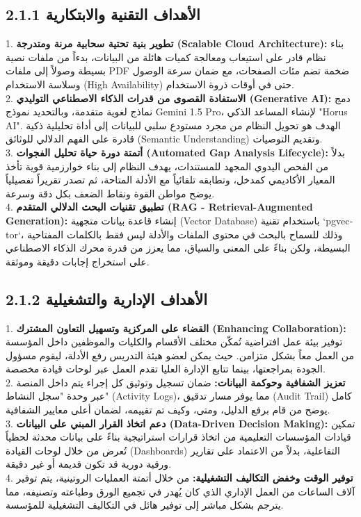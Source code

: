\documentclass[12pt, a4paper]{report}
\begin{document}
\begin{english}
\subsection*{2.1.1 الأهداف التقنية والابتكارية}
1. \textbf{تطوير بنية تحتية سحابية مرنة ومتدرجة (Scalable Cloud Architecture):} بناء نظام قادر على استيعاب ومعالجة كميات هائلة من البيانات، بدءاً من ملفات نصية بسيطة وصولاً إلى ملفات PDF ضخمة تضم مئات الصفحات، مع ضمان سرعة الوصول وسلاسة الاستخدام (High Availability) حتى في أوقات ذروة الاستخدام. \\
2. \textbf{الاستفادة القصوى من قدرات الذكاء الاصطناعي التوليدي (Generative AI):} دمج نماذج لغوية متقدمة، وبالتحديد نموذج Gemini 1.5 Pro، لإنشاء المساعد الذكي "Horus AI". الهدف هو تحويل النظام من مجرد مستودع سلبي للبيانات إلى أداة تحليلية ذكية قادرة على الفهم الدلالي للوثائق (Semantic Understanding) وتقديم التوصيات. \\
3. \textbf{أتمتة دورة حياة تحليل الفجوات (Automated Gap Analysis Lifecycle):} بدلاً من الفحص اليدوي المجهد للمستندات، يهدف النظام إلى بناء خوارزمية قوية تأخذ المعيار الأكاديمي كمدخل، وتطابقه تلقائياً مع الأدلة المتاحة، ثم تصدر تقريراً تفصيلياً يوضح مواطن القوة ونقاط الضعف بكل دقة وسرعة. \\
4. \textbf{تطبيق تقنيات البحث الدلالي المتقدم (RAG - Retrieval-Augmented Generation):} إنشاء قاعدة بيانات متجهية (Vector Database) باستخدام تقنية `pgvector`، وذلك للسماح بالبحث في محتوى الملفات والأدلة ليس فقط بالكلمات المفتاحية البسيطة، ولكن بناءً على المعنى والسياق، مما يعزز من قدرة محرك الذكاء الاصطناعي على استخراج إجابات دقيقة وموثقة. \\

\subsection*{2.1.2 الأهداف الإدارية والتشغيلية}
1. \textbf{القضاء على المركزية وتسهيل التعاون المشترك (Enhancing Collaboration):} توفير بيئة عمل افتراضية تُمكّن مختلف الأقسام والكليات والموظفين داخل المؤسسة من العمل معاً بشكل متزامن. حيث يمكن لعضو هيئة التدريس رفع الأدلة، ليقوم مسؤول الجودة بمراجعتها، بينما تتابع الإدارة العليا تقدم العمل عبر لوحات قيادة مخصصة. \\
2. \textbf{تعزيز الشفافية وحوكمة البيانات:} ضمان تسجيل وتوثيق كل إجراء يتم داخل المنصة عبر وحدة "سجل النشاط" (Activity Logs)، مما يوفر مسار تدقيق (Audit Trail) كامل يوضح من قام برفع الدليل، ومتى، وكيف تم تقييمه، لضمان أعلى معايير الشفافية. \\
3. \textbf{دعم اتخاذ القرار المبني على البيانات (Data-Driven Decision Making):} تمكين قيادات المؤسسات التعليمية من اتخاذ قرارات استراتيجية بناءً على بيانات محدثة لحظياً تُعرض من خلال لوحات القيادة (Dashboards) التفاعلية، بدلاً من الاعتماد على تقارير ورقية دورية قد تكون قديمة أو غير دقيقة. \\
4. \textbf{توفير الوقت وخفض التكاليف التشغيلية:} من خلال أتمتة العمليات الروتينية، يتم توفير آلاف الساعات من العمل الإداري الذي كان يُهدر في تجميع الورق وطباعته وتصنيفه، مما يترجم بشكل مباشر إلى توفير هائل في التكاليف التشغيلية للمؤسسة. \\


\end{english}
\end{document}
